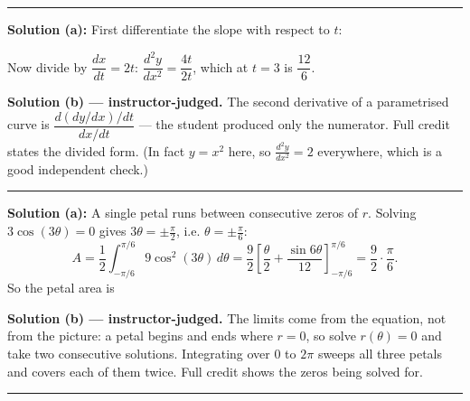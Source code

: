 \documentclass[12pt]{article}
\begin{document}
\vspace{0.2cm}\noindent\rule{\linewidth}{0.2pt}\vspace{0.2cm}


\textbf{Solution (a):} First differentiate the slope with respect to $t$: 

Now divide by $\dfrac{dx}{dt} = 2t$: \; $\dfrac{d^2y}{dx^2} = \dfrac{4t}{2t}$, which at $t = 3$ is $\dfrac{12}{6}$. 

\textbf{Solution (b) --- instructor-judged.} The second derivative of a parametrised curve is $\dfrac{d(dy/dx)/dt}{dx/dt}$ --- the student produced only the numerator. Full credit states the divided form. (In fact $y = x^2$ here, so $\frac{d^2y}{dx^2} = 2$ everywhere, which is a good independent check.)

\vspace{0.2cm}\noindent\rule{\linewidth}{0.2pt}\vspace{0.2cm}


\textbf{Solution (a):} A single petal runs between consecutive zeros of $r$. Solving $3\cos(3\theta) = 0$ gives $3\theta = \pm\frac{\pi}{2}$, i.e. $\theta = \pm\frac{\pi}{6}$:
\[ A = \frac{1}{2}\int_{-\pi/6}^{\pi/6} 9\cos^2(3\theta)\,d\theta = \frac{9}{2}\left[\frac{\theta}{2} + \frac{\sin 6\theta}{12}\right]_{-\pi/6}^{\pi/6} = \frac{9}{2}\cdot\frac{\pi}{6}. \]
So the petal area is 

\textbf{Solution (b) --- instructor-judged.} The limits come from the equation, not from the picture: a petal begins and ends where $r = 0$, so solve $r(\theta) = 0$ and take two consecutive solutions. Integrating over $0$ to $2\pi$ sweeps all three petals and covers each of them twice. Full credit shows the zeros being solved for.

\vspace{0.2cm}\noindent\rule{\linewidth}{0.2pt}\vspace{0.2cm}

\end{document}
